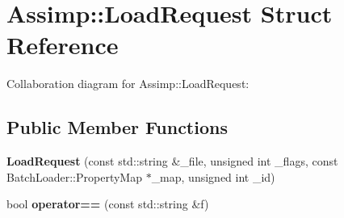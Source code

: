 \hypertarget{struct_assimp_1_1_load_request}{\section{Assimp\+:\+:Load\+Request Struct Reference}
\label{struct_assimp_1_1_load_request}
}


Collaboration diagram for Assimp\+:\+:Load\+Request\+:
\subsection*{Public Member Functions}
\begin{DoxyCompactItemize}
\item 
\hypertarget{struct_assimp_1_1_load_request_ab74303276511310bd8882e242ce2ea0d}{{\bfseries Load\+Request} (const std\+::string \&\+\_\+file, unsigned int \+\_\+flags, const Batch\+Loader\+::\+Property\+Map $\ast$\+\_\+map, unsigned int \+\_\+id)}\label{struct_assimp_1_1_load_request_ab74303276511310bd8882e242ce2ea0d}

\item 
\hypertarget{struct_assimp_1_1_load_request_ad2284a7449fa2518c11472a2bd1c02bc}{bool {\bfseries operator==} (const std\+::string \&f)}\label{struct_assimp_1_1_load_request_ad2284a7449fa2518c11472a2bd1c02bc}

\end{DoxyCompactItemize}
